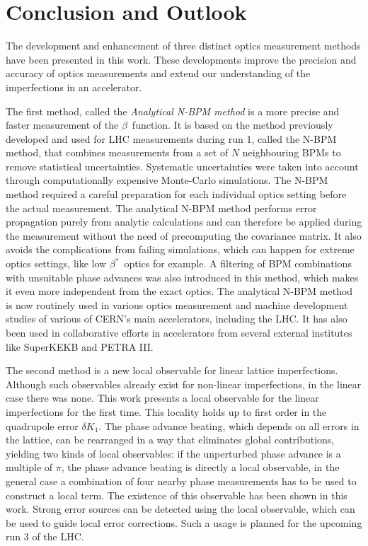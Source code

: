 \chapter{Conclusion and Outlook}
\label{ch_conclusion}

The development and enhancement of three distinct optics measurement methods have been presented in this work.
These developments improve the precision and accuracy of optics measurements and extend our understanding of the
imperfections in an accelerator.

The first method, called the \emph{Analytical N-BPM method} is a more precise and faster measurement of the $\beta$~function.
It is based on the method previously developed and used for LHC measurements during run 1, called the N-BPM method,
that combines measurements from a set of $N$ neighbouring BPMs to remove statistical uncertainties.
Systematic uncertainties were taken into account through computationally expensive Monte-Carlo simulations.
The N-BPM method required a careful preparation for each individual optics setting before the actual measurement.
The analytical N-BPM method performs error propagation purely from analytic calculations and can therefore be applied
during the measurement without the need of precomputing the covariance matrix.
It also avoids the complications from failing simulations, which can happen for extreme optics settings,
like low $\beta^*$~optics for example.
A filtering of BPM combinations with unsuitable phase advances was also introduced in this method, which makes it even
more independent from the exact optics.
The analytical N-BPM method is now routinely used in various optics measurement and machine development
studies of various of CERN's main accelerators, including the LHC.
It has also been used in collaborative
efforts in accelerators from several external institutes like SuperKEKB and PETRA III.

The second method is a new local observable for linear lattice imperfections.
Although such observables already exist for non-linear imperfections, in the linear case there was none.
This work presents a local observable for the linear imperfections for the first time. This locality holds up to first
order in the quadrupole error $\delta K_1$.
The phase advance beating, which depends on all errors in the lattice, can be rearranged in a way that eliminates
global contributions, yielding two kinds of local observables:
if the unperturbed phase advance is a multiple of $\pi$, the phase advance beating is directly a local observable,
in the general case a combination of four nearby phase measurements has to be used to construct a local term.
The existence of this observable has been shown in this work.
Strong error sources can be detected using the local observable, which can be used to guide local error corrections.
Such a usage is planned for the upcoming run 3 of the LHC.

